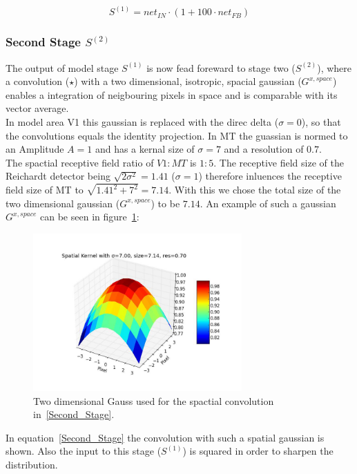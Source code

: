 \documentclass[a4paper]{article}
\begin{document}
\begin{equation}
S^{(1)}=net_{IN}\cdot(1+100\cdot net_{FB})
\label{First_Stage}
\end{equation}

\subsubsection{Second Stage $S^{(2)}$}
The output of model stage $S^{(1)}$ is now fead foreward to stage two ($S^{(2)}$), where a convolution ($\star$) with a two dimensional, isotropic, spacial gaussian ($G^{x,space}$) enables a integration of neigbouring pixels in space and is comparable with its vector average.\\
In model area V1 this gaussian is replaced with the direc delta ($\sigma=0$), so that the convolutions equals the identity projection. In MT the guassian is normed to an Amplitude $A=1$ and has a kernal size of $\sigma=7$ and a resolution of $0.7$.\\
The spactial receptive field ratio of $V1:MT$ is $1:5$. The receptive field size of the Reichardt detector being $\sqrt{2\sigma^{2}}=1.41$ ($\sigma=1$) therefore inluences the receptive field size of MT to $\sqrt{1.41^{2}+7^{2}}=7.14$. With this we chose the total size of the two dimensional gaussian ($G^{x,space}$) to be $7.14$.
An example of such a gaussian $G^{x,space}$ can be seen in figure~\ref{fig:spatialGauss}:

\vspace{0.5cm}
\begin{figure}[ht]
\centering
\includegraphics[width=8cm]{pics/spatialGauss}
\caption{Two dimensional Gauss used for the spactial convolution in~\eqref{Second_Stage}.}
\label{fig:spatialGauss}
\end{figure}
\vspace{0.5cm}

In equation~\eqref{Second_Stage} the convolution with such a spatial gaussian is shown. Also the input to this stage ($S^{(1)}$) is squared in order to sharpen the distribution.
\end{document}
